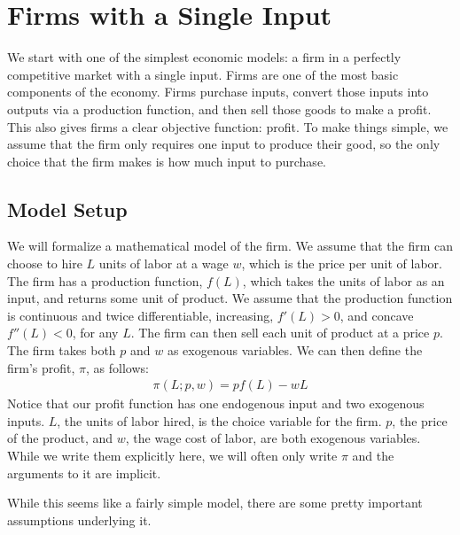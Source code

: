 \chapter{Firms with a Single Input}
We start with one of the simplest economic models: a firm in a perfectly competitive market with a single input. Firms are one of the most basic components of the economy. Firms purchase inputs, convert those inputs into outputs via a production function, and then sell those goods to make a profit. This also gives firms a clear objective function: profit. To make things simple, we assume that the firm only requires one input to produce their good, so the only choice that the firm makes is how much input to purchase. 

\section{Model Setup} \label{sec:single_firm_setup}
We will formalize a mathematical model of the firm. We assume that the firm can choose to hire $L$ units of labor at a wage $w$, which is the price per unit of labor. The firm has a production function, $f(L)$, which takes the units of labor as an input, and returns some unit of product. We assume that the production function is continuous and twice differentiable, increasing, $f'(L) > 0$, and concave $f''(L) < 0$, for any $L$. The firm can then sell each unit of product at a price $p$. The firm takes both $p$ and $w$ as exogenous variables. We can then define the firm's profit, $\pi$, as follows:
\begin{align}
    \pi(L; p, w) = p f(L) - w L \label{eq:profit_def}
\end{align}
Notice that our profit function has one endogenous input and two exogenous inputs. $L$, the units of labor hired, is the choice variable for the firm. $p$, the price of the product, and $w$, the wage cost of labor, are both exogenous variables. While we write them explicitly here, we will often only write $\pi$ and the arguments to it are implicit. 

While this seems like a fairly simple model, there are some pretty important assumptions underlying it.

